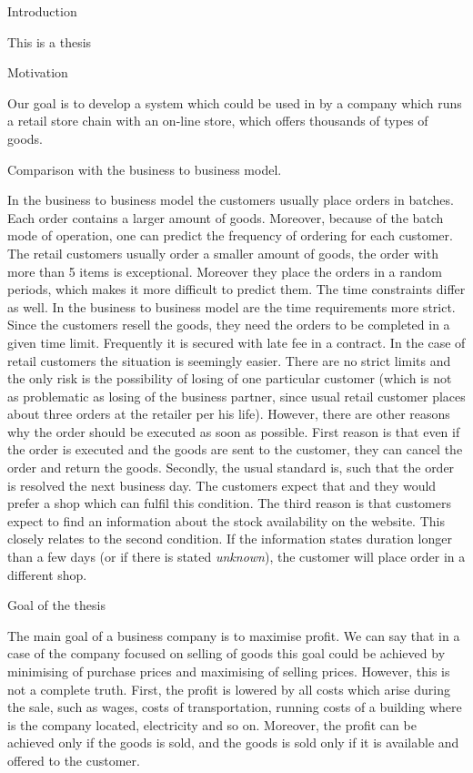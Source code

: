 \newpage
\chap Introduction

This is a thesis

\sec Motivation

Our goal is to develop a system which could be used in by a company which runs a retail store chain with an on-line store, which offers thousands of types of goods.

\secc Comparison with the business to business model.

In the business to business model the customers usually place orders in batches. Each order contains a larger amount of goods. Moreover, because of the batch mode of operation,
one can predict the frequency of ordering for each customer. The retail customers usually order a smaller amount of goods, the order with more than 5 items is exceptional. 
Moreover they place the orders in a random periods, which makes it more difficult to predict them. The time constraints differ as well. In the business to business model
are the time requirements more strict. Since the customers resell the goods, they need the orders to be completed in a given time limit. Frequently it is secured with
late fee in a contract. In the case of retail customers the situation is seemingly easier. There are no strict limits and the only risk is the possibility of losing
of one particular customer (which is not as problematic as losing of the business partner, since usual retail customer places about three orders at the retailer
per his life). However, there are other reasons why the order should be executed as soon as possible. First reason is that even if the order is executed and the goods
are sent to the customer, they can cancel the order and return the goods. Secondly, the usual standard is, such that the order is resolved the next business day.
The customers expect that and they would prefer a shop which can fulfil this condition. The third reason is that customers expect to find an information about the
stock availability on the website. This closely relates to the second condition. If the information states duration longer than a few days (or if there is stated 
{\em unknown}), the customer will place order in a different shop.

\secc Goal of the thesis

The main goal of a business company is to maximise profit. We can say that in a case of the company focused on selling of goods this goal could be achieved by minimising
of purchase prices and maximising of selling prices. However, this is not a complete truth. First, the profit is lowered by all costs which arise during the sale, such as
wages, costs of transportation, running costs of a building where is the company located, electricity and so on. Moreover, the profit can be achieved only if the goods
is sold, and the goods is sold only if it is available and offered to the customer.

